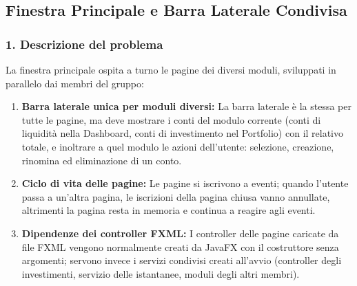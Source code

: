 \documentclass[11pt,a4paper,openright]{report}
\begin{document}
\subsection{Finestra Principale e Barra Laterale Condivisa}

\subsubsection*{1. Descrizione del problema}
La finestra principale ospita a turno le pagine dei diversi moduli, sviluppati in parallelo dai membri del gruppo:
\begin{enumerate}
    \item \textbf{Barra laterale unica per moduli diversi:} La barra laterale è la stessa per tutte le pagine, ma deve mostrare i conti del modulo corrente (conti di liquidità nella Dashboard, conti di investimento nel Portfolio) con il relativo totale, e inoltrare a quel modulo le azioni dell'utente: selezione, creazione, rinomina ed eliminazione di un conto.
    \item \textbf{Ciclo di vita delle pagine:} Le pagine si iscrivono a eventi; quando l'utente passa a un'altra pagina, le iscrizioni della pagina chiusa vanno annullate, altrimenti la pagina resta in memoria e continua a reagire agli eventi.
    \item \textbf{Dipendenze dei controller FXML:} I controller delle pagine caricate da file FXML vengono normalmente creati da JavaFX con il costruttore senza argomenti; servono invece i servizi condivisi creati all'avvio (controller degli investimenti, servizio delle istantanee, moduli degli altri membri).
\end{enumerate}
\end{document}
